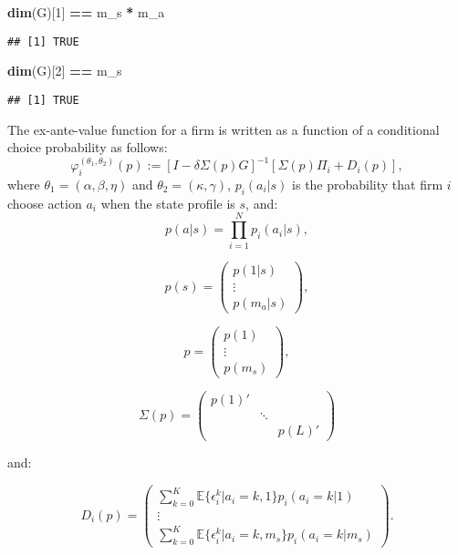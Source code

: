 \documentclass[
]{book}
\newenvironment{Shaded}{\begin{snugshade}}{\end{snugshade}}
\newcommand{\DecValTok}[1]{\textcolor[rgb]{0.00,0.00,0.81}{#1}}
\newcommand{\KeywordTok}[1]{\textcolor[rgb]{0.13,0.29,0.53}{\textbf{#1}}}
\newcommand{\NormalTok}[1]{#1}
\newcommand{\OperatorTok}[1]{\textcolor[rgb]{0.81,0.36,0.00}{\textbf{#1}}}
\newcommand{\StringTok}[1]{\textcolor[rgb]{0.31,0.60,0.02}{#1}}
\begin{document}
\begin{Shaded}
\begin{Highlighting}[]
\KeywordTok{dim}\NormalTok{(G)[}\DecValTok{1}\NormalTok{] }\OperatorTok{==}\StringTok{ }\NormalTok{m_s }\OperatorTok{*}\StringTok{ }\NormalTok{m_a}
\end{Highlighting}
\end{Shaded}

\begin{verbatim}
## [1] TRUE
\end{verbatim}

\begin{Shaded}
\begin{Highlighting}[]
\KeywordTok{dim}\NormalTok{(G)[}\DecValTok{2}\NormalTok{] }\OperatorTok{==}\StringTok{ }\NormalTok{m_s}
\end{Highlighting}
\end{Shaded}

\begin{verbatim}
## [1] TRUE
\end{verbatim}

The ex-ante-value function for a firm is written as a function of a conditional choice probability as follows:
\[
\varphi_i^{(\theta_1, \theta_2)}(p) := [I - \delta \Sigma(p) G]^{-1}[\Sigma(p)\Pi_i + D_i(p)],
\]
where \(\theta_1 = (\alpha, \beta, \eta)\) and \(\theta_2 = (\kappa, \gamma)\), \(p_i(a_i|s)\) is the probability that firm \(i\) choose action \(a_i\) when the state profile is \(s\), and:
\[
p(a|s) = \prod_{i = 1}^N p_i(a_i|s), 
\]

\[
p(s) = 
\begin{pmatrix}
p(1|s) \\
\vdots \\
p(m_a|s)
\end{pmatrix},
\]

\[
p = 
\begin{pmatrix}
p(1)\\
\vdots\\
p(m_s)
\end{pmatrix},
\]

\[
\Sigma(p) =
\begin{pmatrix}
p(1)' & & \\
 & \ddots & \\
 & & p(L)'
\end{pmatrix}
\]

and:

\[
D_i(p) =
\begin{pmatrix}
\sum_{k = 0}^K \mathbb{E}\{\epsilon_i^k|a_i = k, 1\}p_i(a_i = k|1)\\
\vdots\\
\sum_{k = 0}^K \mathbb{E}\{\epsilon_i^k|a_i = k, m_s\}p_i(a_i = k|m_s)
\end{pmatrix}.
\]
\end{document}
